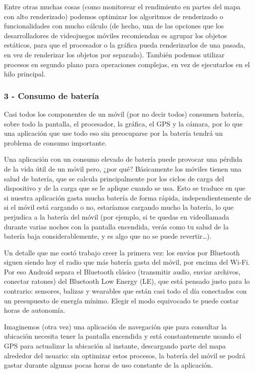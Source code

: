 Entre otras muchas cosas (como monitorear el rendimiento en partes del mapa con alto renderizado) podemos optimizar los algoritmos de renderizado o funcionalidades con mucho cálculo (de hecho, una de las opciones que los desarrolladores de videojuegos móviles recomiendan es agrupar los objetos estáticos, para que el procesador o la gráfica pueda renderizarlos de una pasada, en vez de renderizar los objetos por separado). También podemos utilizar procesos en segundo plano para operaciones complejas, en vez de ejecutarlos en el hilo principal.

\subsubsection*{3 - Consumo de batería}

Casi todos los componentes de un móvil (por no decir todos) consumen batería, sobre todo la pantalla, el procesador, la gráfica, el GPS y la cámara, por lo que una aplicación que use todo eso sin preocuparse por la batería tendrá un problema de consumo importante.

Una aplicación con un consumo elevado de batería puede provocar una pérdida de la vida útil de un móvil pero, ¿por qué? Básicamente los móviles tienen una salud de batería, que se calcula principalmente por los ciclos de carga del dispositivo y de la carga que se le aplique cuando se usa. Esto se traduce en que si nuestra aplicación gasta mucha batería de forma rápida, independientemente de si el móvil está cargando o no, estaríamos cargando mucho la batería, lo que perjudica a la batería del móvil (por ejemplo, si te quedas en videollamada durante varias noches con la pantalla encendida, verás como tu salud de la batería baja considerablemente, y es algo que no se puede revertir\ldots).

Un detalle que me costó trabajo creer la primera vez: los envíos por Bluetooth siguen siendo hoy el radio que más batería gasta del móvil, por encima del Wi-Fi. Por eso Android separa el Bluetooth clásico (transmitir audio, enviar archivos, conectar ratones) del Bluetooth Low Energy (LE), que está pensado justo para lo contrario: sensores, balizas y wearables que están casi todo el día conectados con un presupuesto de energía mínimo. Elegir el modo equivocado te puede costar horas de autonomía.

Imaginemos (otra vez) una aplicación de navegación que para consultar la ubicación necesita tener la pantalla encendida y está constantemente usando el GPS para actualizar la ubicación al instante, descargando parte del mapa alrededor del usuario: sin optimizar estos procesos, la batería del móvil se podrá gastar durante algunas pocas horas de uso constante de la aplicación.

